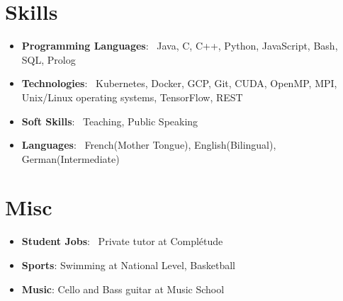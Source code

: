 \documentclass[a4paper,20pt]{article}
\newcommand{\resumeItem}[2]{
  \item\small{
    \textbf{#1}{: #2 \vspace{-2pt}}
  }
}
\newcommand{\resumeSubItem}[2]{\resumeItem{#1}{#2}\vspace{-3pt}}
\newcommand{\resumeSubHeadingListStart}{\begin{itemize}[leftmargin=*]}
\newcommand{\resumeSubHeadingListEnd}{\end{itemize}}
\begin{document}
\section{Skills}
 \resumeSubHeadingListStart
  \resumeSubItem{Programming Languages}{~Java, C, C++, Python, JavaScript, Bash, SQL, Prolog}
  \resumeSubItem{Technologies}{~Kubernetes, Docker, GCP, Git, CUDA, OpenMP, MPI, Unix/Linux operating systems, TensorFlow, REST}
  \resumeSubItem{Soft Skills}{~Teaching, Public Speaking }
  \resumeSubItem{Languages}{~French(Mother Tongue), English(Bilingual), German(Intermediate)}
 \resumeSubHeadingListEnd

\section{Misc}
 \resumeSubHeadingListStart
  \resumeSubItem{Student Jobs}{~Private tutor at Complétude}
  \resumeSubItem{Sports}{Swimming at National Level, Basketball}
  \resumeSubItem{Music}{Cello and Bass guitar at Music School}
 \resumeSubHeadingListEnd
\end{document}
